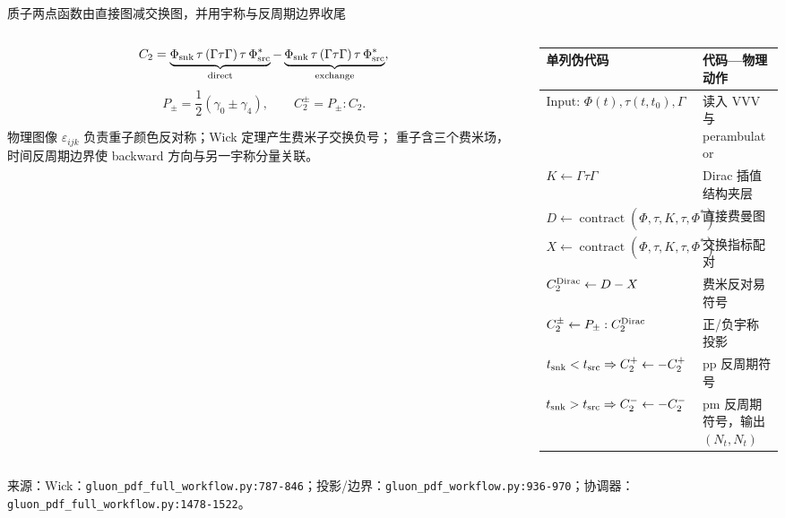 \documentclass[UTF8,aspectratio=169,11pt]{ctexbeamer}
\newcommand{\source}[1]{%
  \vspace{0.06em}\par{\raggedright\scriptsize\color{muted}来源：#1\par}}
\newcommand{\codepath}[1]{\nolinkurl{#1}}
\begin{document}
\begin{frame}[t]{质子两点函数由直接图减交换图，并用宇称与反周期边界收尾}
  \begin{columns}[T,totalwidth=\textwidth]
    \begin{column}{0.46\textwidth}
      \footnotesize
      \begin{equation*}
        C_2=\underbrace{\Phi_{\rm snk}\,\tau\,(\Gamma\tau\Gamma)\,\tau\,\Phi_{\rm src}^*}_{\rm direct}
        -\underbrace{\Phi_{\rm snk}\,\tau\,(\Gamma\tau\Gamma)\,\tau\,\Phi_{\rm src}^*}_{\rm exchange},
      \end{equation*}
      \begin{equation*}
        P_\pm=\frac{1}{2}(\gamma_0\pm\gamma_4),\qquad
        C_2^{\pm}=P_\pm:C_2.
      \end{equation*}
      \begin{block}{物理图像}
        \(\varepsilon_{ijk}\) 负责重子颜色反对称；Wick 定理产生费米子交换负号；
        重子含三个费米场，时间反周期边界使 backward 方向与另一宇称分量关联。
      \end{block}
    \end{column}
    \begin{column}{0.50\textwidth}
      \small
      \begin{tabularx}{\linewidth}{@{}lY@{}}
        \toprule
        单列伪代码 & 代码—物理动作 \\
        \midrule
        \(\text{Input: }\Phi(t),\tau(t,t_0),\Gamma\) & 读入 VVV 与 perambulator \\
        \(K\gets\Gamma\tau\Gamma\) & Dirac 插值结构夹层 \\
        \(D\gets\operatorname{contract}(\Phi,\tau,K,\tau,\Phi^*)\) & 直接费曼图 \\
        \(X\gets\operatorname{contract}(\Phi,\tau,K,\tau,\Phi^*)\) & 交换指标配对 \\
        \(C_2^{\rm Dirac}\gets D-X\) & 费米反对易符号 \\
        \(C_2^\pm\gets P_\pm:C_2^{\rm Dirac}\) & 正/负宇称投影 \\
        \(t_{\rm snk}<t_{\rm src}\Rightarrow C_2^+\gets-C_2^+\) & pp 反周期符号 \\
        \(t_{\rm snk}>t_{\rm src}\Rightarrow C_2^-\gets-C_2^-\) & pm 反周期符号，输出 \((N_t,N_t)\) \\
        \bottomrule
      \end{tabularx}
    \end{column}
  \end{columns}
  \source{Wick：\codepath{gluon_pdf_full_workflow.py:787-846}；投影/边界：\codepath{gluon_pdf_workflow.py:936-970}；协调器：\codepath{gluon_pdf_full_workflow.py:1478-1522}。}
\end{frame}
\end{document}
